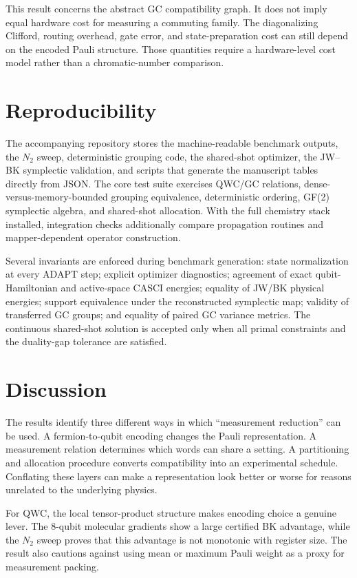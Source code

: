 \documentclass[aps,pra,twocolumn,superscriptaddress,nofootinbib,floatfix]{revtex4-2}
\begin{document}
This result concerns the abstract GC compatibility graph. It does not imply equal hardware cost for measuring a commuting family. The diagonalizing Clifford, routing overhead, gate error, and state-preparation cost can still depend on the encoded Pauli structure. Those quantities require a hardware-level cost model rather than a chromatic-number comparison.

\section{Reproducibility}

The accompanying repository stores the machine-readable benchmark outputs, the $N_2$ sweep, deterministic grouping code, the shared-shot optimizer, the JW--BK symplectic validation, and scripts that generate the manuscript tables directly from JSON. The core test suite exercises QWC/GC relations, dense-versus-memory-bounded grouping equivalence, deterministic ordering, GF(2) symplectic algebra, and shared-shot allocation. With the full chemistry stack installed, integration checks additionally compare propagation routines and mapper-dependent operator construction.

Several invariants are enforced during benchmark generation: state normalization at every ADAPT step; explicit optimizer diagnostics; agreement of exact qubit-Hamiltonian and active-space CASCI energies; equality of JW/BK physical energies; support equivalence under the reconstructed symplectic map; validity of transferred GC groups; and equality of paired GC variance metrics. The continuous shared-shot solution is accepted only when all primal constraints and the duality-gap tolerance are satisfied.

\section{Discussion}

The results identify three different ways in which ``measurement reduction'' can be used. A fermion-to-qubit encoding changes the Pauli representation. A measurement relation determines which words can share a setting. A partitioning and allocation procedure converts compatibility into an experimental schedule. Conflating these layers can make a representation look better or worse for reasons unrelated to the underlying physics.

For QWC, the local tensor-product structure makes encoding choice a genuine lever. The 8-qubit molecular gradients show a large certified BK advantage, while the $N_2$ sweep proves that this advantage is not monotonic with register size. The result also cautions against using mean or maximum Pauli weight as a proxy for measurement packing.
\end{document}
